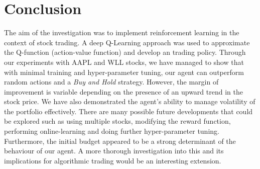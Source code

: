 \documentclass[12pt]{article}
\begin{document}
\section{Conclusion}

The aim of the investigation was to implement reinforcement learning in the context of stock trading. A deep Q-Learning approach was used to approximate the Q-function (action-value function) and develop an trading policy. Through our experiments with AAPL and WLL stocks, we have managed to show that with minimal training and hyper-parameter tuning, our agent can outperform random actions and a \textit{Buy and Hold} strategy. However, the margin of improvement is variable depending on the presence of an upward trend in the stock price.  We have also demonstrated the agent's ability to manage volatility of the portfolio effectively. There are many possible future developments that could be explored such as using multiple stocks, modifying the reward function, performing online-learning and doing further hyper-parameter tuning. Furthermore, the initial budget appeared to be a strong determinant of the behaviour of our agent. A more thorough investigation into this and its implications for algorithmic trading would be an interesting extension.
\end{document}
